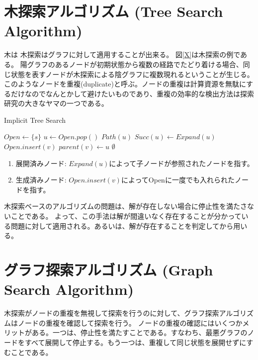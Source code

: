 \documentclass{report}
\begin{document}
\section{木探索アルゴリズム (Tree Search Algorithm)}
\label{sec:tree-search-algorithm}
木は
木探索はグラフに対して適用することが出来る。
図\ref{X}は木探索の例である。
陽グラフのあるノードが初期状態から複数の経路でたどり着ける場合、同じ状態を表すノードが木探索による陰グラフに複数現れるということが生じる。このようなノードを重複(duplicate)と呼ぶ。ノードの重複は計算資源を無駄にするだけなのでなんとかして避けたいものであり、重複の効率的な検出方法は探索研究の大きなヤマの一つである。


\begin{algorithm}
\caption{Implicit Tree Search}
\label{alg:implicit-tree-search}
	$Open \leftarrow \{s\}$\;
	 {
		$u \leftarrow Open.pop()$\;
		 {
			\Return $Path(u)$\;
		}
		$Succ(u) \leftarrow Expand(u)$\;
		 {
			$Open.insert(v)$\;
			$parent(v) \leftarrow u$\;
		}
 	}
	\Return $\emptyset$\;
\end{algorithm}

\begin{enumerate}
\item 展開済みノード: $Expand(u)$によって子ノードが参照されたノードを指す。
\item 生成済みノード: $Open.insert(v)$によってOpenに一度でも入れられたノードを指す。

\end{enumerate}

木探索ベースのアルゴリズムの問題は、解が存在しない場合に停止性を満たさないことである。
よって、この手法は解が間違いなく存在することが分かっている問題に対して適用される。あるいは、解が存在することを判定してから用いる。

\section{グラフ探索アルゴリズム (Graph Search Algorithm)}
\label{sec:graph-search-algorithm}

木探索がノードの重複を無視して探索を行うのに対して、グラフ探索アルゴリズムはノードの重複を確認して探索を行う。
ノードの重複の確認にはいくつかメリットがある。一つは、停止性を満たすことである。すなわち、最悪グラフのノードをすべて展開して停止する。もう一つは、重複して同じ状態を展開せずにすむことである。
\end{document}

